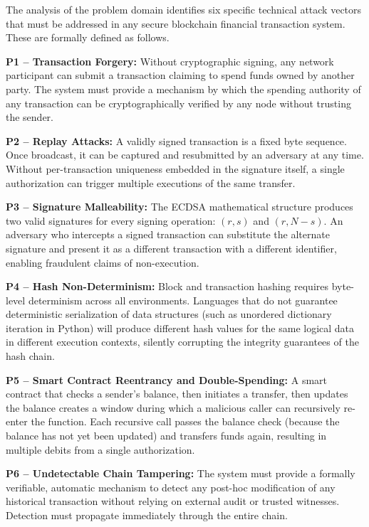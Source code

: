 \documentclass[12pt,a4paper]{report}
\begin{document}
The analysis of the problem domain identifies six specific technical attack vectors
that must be addressed in any secure blockchain financial transaction system. These
are formally defined as follows.

\textbf{P1 -- Transaction Forgery:} Without cryptographic signing, any network participant
can submit a transaction claiming to spend funds owned by another party. The system must
provide a mechanism by which the spending authority of any transaction can be
cryptographically verified by any node without trusting the sender.

\textbf{P2 -- Replay Attacks:} A validly signed transaction is a fixed byte sequence.
Once broadcast, it can be captured and resubmitted by an adversary at any time. Without
per-transaction uniqueness embedded in the signature itself, a single authorization can
trigger multiple executions of the same transfer.

\textbf{P3 -- Signature Malleability:} The ECDSA mathematical structure produces two
valid signatures for every signing operation: $(r, s)$ and $(r, N-s)$. An adversary who
intercepts a signed transaction can substitute the alternate signature and present it as
a different transaction with a different identifier, enabling fraudulent claims of
non-execution.

\textbf{P4 -- Hash Non-Determinism:} Block and transaction hashing requires byte-level
determinism across all environments. Languages that do not guarantee deterministic
serialization of data structures (such as unordered dictionary iteration in Python) will
produce different hash values for the same logical data in different execution contexts,
silently corrupting the integrity guarantees of the hash chain.

\textbf{P5 -- Smart Contract Reentrancy and Double-Spending:} A smart contract that
checks a sender's balance, then initiates a transfer, then updates the balance creates
a window during which a malicious caller can recursively re-enter the function. Each
recursive call passes the balance check (because the balance has not yet been updated)
and transfers funds again, resulting in multiple debits from a single authorization.

\textbf{P6 -- Undetectable Chain Tampering:} The system must provide a formally
verifiable, automatic mechanism to detect any post-hoc modification of any historical
transaction without relying on external audit or trusted witnesses. Detection must
propagate immediately through the entire chain.
\end{document}
